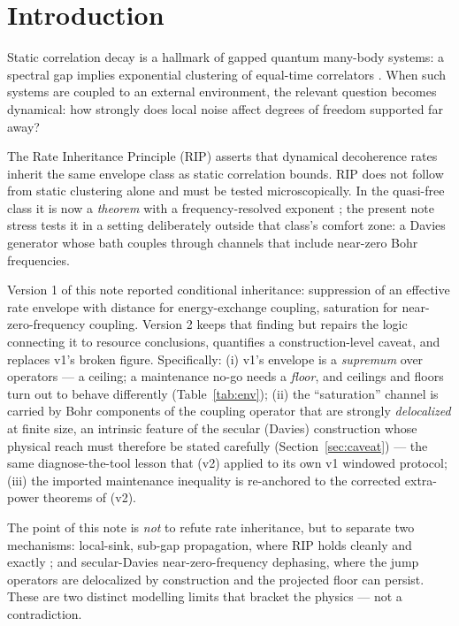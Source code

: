 \documentclass[11pt,a4paper]{article}
\theoremstyle{plain}
\theoremstyle{definition}
\theoremstyle{remark}
\begin{document}
\section{Introduction}

Static correlation decay is a hallmark of gapped quantum many-body systems: a
spectral gap implies exponential clustering of equal-time correlators
\cite{HastingsKoma}. When such systems are coupled to an external environment,
the relevant question becomes dynamical: how strongly does local noise affect
degrees of freedom supported far away?

The Rate Inheritance Principle (RIP) asserts that dynamical decoherence rates
inherit the same envelope class as static correlation bounds. RIP does not
follow from static clustering alone and must be tested microscopically. In the
quasi-free class it is now a \emph{theorem} with a frequency-resolved exponent
\cite{HCut}; the present note stress tests it in a setting deliberately
outside that class's comfort zone: a Davies generator whose bath couples
through channels that include near-zero Bohr frequencies.

Version 1 of this note reported conditional inheritance: suppression of an
effective rate envelope with distance for energy-exchange coupling, saturation
for near-zero-frequency coupling. Version 2 keeps that finding but repairs the
logic connecting it to resource conclusions, quantifies a construction-level
caveat, and replaces v1's broken figure. Specifically: (i) v1's envelope is a
\emph{supremum} over operators --- a ceiling; a maintenance no-go needs a
\emph{floor}, and ceilings and floors turn out to behave differently
(Table~\ref{tab:env}); (ii) the ``saturation'' channel is carried by Bohr
components of the coupling operator that are strongly \emph{delocalized} at
finite size, an intrinsic feature of the secular (Davies) construction whose
physical reach must therefore be stated carefully (Section~\ref{sec:caveat}) —
the same diagnose-the-tool lesson that \cite{HCut} (v2) applied to its own v1
windowed protocol; (iii) the imported maintenance inequality is re-anchored to
the corrected extra-power theorems of \cite{MaintWork} (v2).

The point of this note is \emph{not} to refute rate inheritance, but to
separate two mechanisms: local-sink, sub-gap propagation, where RIP holds
cleanly and exactly \cite{HCut}; and secular-Davies near-zero-frequency
dephasing, where the jump operators are delocalized by construction and the
projected floor can persist. These are two distinct modelling limits that
bracket the physics --- not a contradiction.
\end{document}

